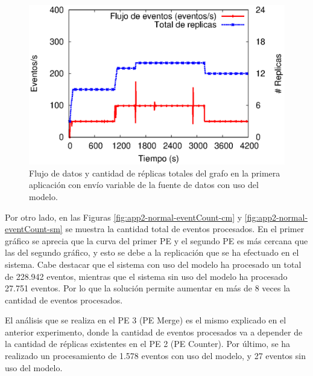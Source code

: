 \begin{figure}[!ht]
	\centering
	\includegraphics[scale=0.7]{images/exp/app2/normal/cm/processSystem.eps}
    \caption{Flujo de datos y cantidad de réplicas totales del grafo en la primera aplicación con envío variable de la fuente de datos con uso del modelo.}
	\label{fig:app2-normal-processSystem-cm}
\end{figure}


Por otro lado, en las Figuras \ref{fig:app2-normal-eventCount-cm} y \ref{fig:app2-normal-eventCount-sm} se muestra la cantidad total de eventos procesados. En el primer gráfico se aprecia que la curva del primer PE y el segundo PE es más cercana que las del segundo gráfico, y esto se debe a la replicación que se ha efectuado en el sistema. Cabe destacar que el sistema con uso del modelo ha procesado un total de 228.942 eventos, mientras que el sistema sin uso del modelo ha procesado 27.751 eventos. Por lo que la solución permite aumentar en más de 8 veces la cantidad de eventos procesados.

El análisis que se realiza en el PE 3 (PE Merge) es el mismo explicado en el anterior experimento, donde la cantidad de eventos procesados va a depender de la cantidad de réplicas existentes en el PE 2 (PE Counter). Por último, se ha realizado un procesamiento de 1.578 eventos con uso del modelo, y 27 eventos sin uso del modelo.

